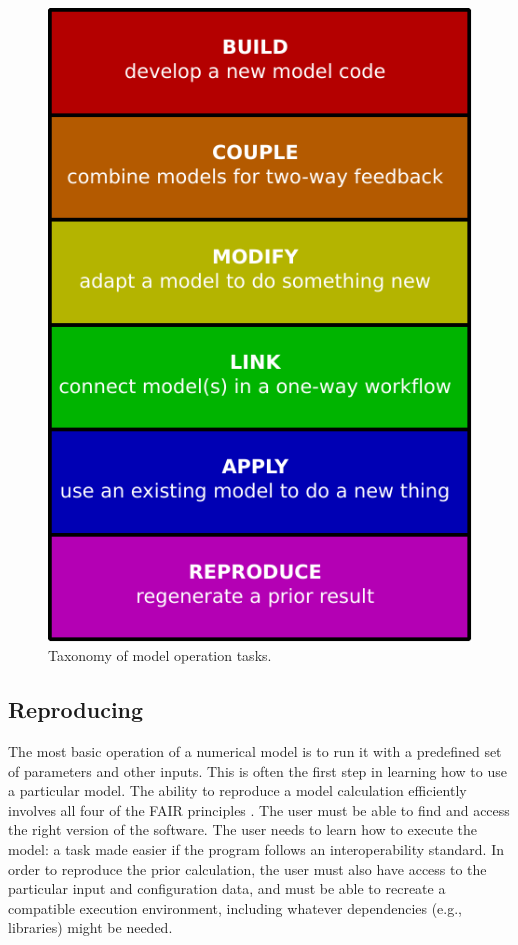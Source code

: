 \documentclass[12pt]{amsart}
\begin{document}
\begin{figure}[h!]
\centering
\includegraphics[scale=0.8]{Figures/model_operation_taxonomy.pdf}
\caption{Taxonomy of model operation tasks.}
\label{fig:taxonomy}
\end{figure}


\subsection{Reproducing}

The most basic operation of a numerical model is to run it with a predefined set of parameters and other inputs. This is often the first step in learning how to use a particular model. The ability to reproduce a model calculation efficiently involves all four of the FAIR principles \citep{wilkinson2016fair}. The user must be able to find and access the right version of the software. The user needs to learn how to execute the model: a task made easier if the program follows an interoperability standard. In order to reproduce the prior calculation, the user must also have access to the particular input and configuration data, and must be able to recreate a compatible execution environment, including whatever dependencies (e.g., libraries) might be needed.
\end{document}
